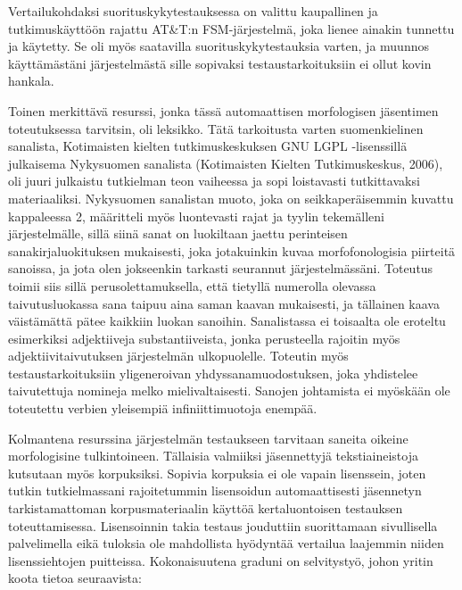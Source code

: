 \documentclass[free]{flammie}
\begin{document}
Vertailukohdaksi suorituskykytestauksessa on valittu kaupallinen ja
tutkimuskäyttöön rajattu AT\&T:n FSM-järjestelmä, joka lienee ainakin tunnettu ja käytetty. Se
oli myös saatavilla suorituskykytestauksia varten, ja muunnos käyttämästäni järjestelmästä sille sopivaksi testaustarkoituksiin ei ollut kovin hankala.

Toinen merkittävä resurssi, jonka tässä automaattisen morfologisen jäsentimen
toteutuksessa tarvitsin, oli leksikko. Tätä tarkoitusta varten suomenkielinen sanalista, Kotimaisten kielten tutkimuskeskuksen GNU LGPL -lisenssillä julkaisema Nykysuomen sanalista (Kotimaisten Kielten Tutkimuskeskus, 2006), oli juuri
julkaistu tutkielman teon vaiheessa ja sopi loistavasti tutkittavaksi materiaaliksi.
Nykysuomen sanalistan muoto, joka on seikkaperäisemmin kuvattu kappaleessa
2, määritteli myös luontevasti rajat ja tyylin tekemälleni järjestelmälle, sillä siinä
sanat on luokiltaan jaettu perinteisen sanakirjaluokituksen mukaisesti, joka jotakuinkin kuvaa morfofonologisia piirteitä sanoissa, ja jota olen jokseenkin tarkasti
seurannut järjestelmässäni. Toteutus toimii siis sillä perusolettamuksella, että tietyllä numerolla olevassa taivutusluokassa sana taipuu aina saman kaavan mukaisesti, ja tällainen kaava väistämättä pätee kaikkiin luokan sanoihin. Sanalistassa
ei toisaalta ole eroteltu esimerkiksi adjektiiveja substantiiveista, jonka perusteella
rajoitin myös adjektiivitaivutuksen järjestelmän ulkopuolelle. Toteutin myös testaustarkoituksiin yligeneroivan yhdyssanamuodostuksen, joka yhdistelee taivutettuja nomineja melko mielivaltaisesti. Sanojen johtamista ei myöskään ole toteutettu verbien yleisempiä infiniittimuotoja enempää.

Kolmantena resurssina järjestelmän testaukseen tarvitaan saneita oikeine morfologisine tulkintoineen. Tällaisia valmiiksi jäsennettyjä tekstiaineistoja kutsutaan
myös korpuksiksi. Sopivia korpuksia ei ole vapain lisenssein, joten tutkin tutkielmassani rajoitetummin lisensoidun automaattisesti jäsennetyn tarkistamattoman
korpusmateriaalin käyttöä kertaluontoisen testauksen toteuttamisessa. Lisensoinnin takia testaus jouduttiin suorittamaan sivullisella palvelimella eikä tuloksia ole
mahdollista hyödyntää vertailua laajemmin niiden lisenssiehtojen puitteissa.
Kokonaisuutena graduni on selvitystyö, johon yritin koota tietoa seuraavista:
\end{document}
